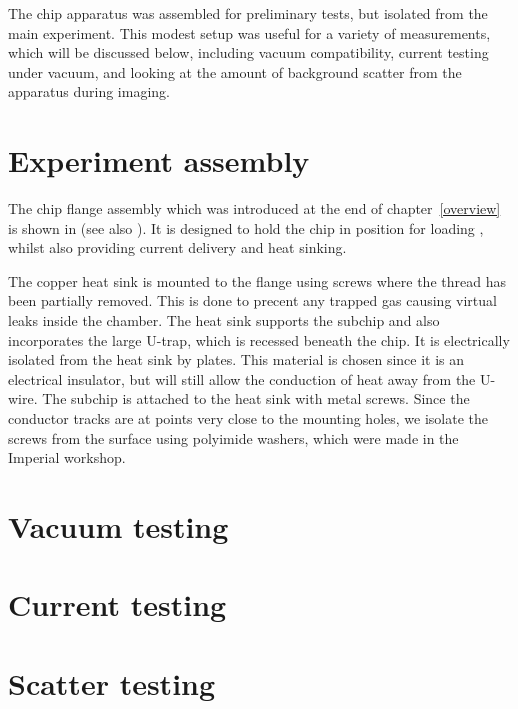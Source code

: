 The chip apparatus was assembled for preliminary tests, but isolated from the 
main \CaF{} experiment. This modest setup was useful for a variety of
measurements, which will be discussed below, including vacuum compatibility,
current testing under vacuum, and looking at the amount of background scatter
from the apparatus during imaging.

\section{Experiment assembly}

The chip flange assembly which was introduced at the end of
chapter~\ref{overview} is shown in  (see also
). It is designed
to hold the chip in position for loading \CaF{}, whilst also providing current
delivery and heat sinking. 

\begin{figure}
  \centering
  \caption{}
  \label{exper:fig:flange}
\end{figure}

The copper heat sink is mounted to the flange using screws where the thread has
been partially removed. This is done to precent any trapped gas causing virtual
leaks inside the chamber. The heat sink supports the subchip and also incorporates the large
U-trap, which is recessed beneath the chip. It is electrically isolated from
the heat sink by \AlN{} plates. This material is chosen since it is an
electrical insulator, but will still allow the conduction of heat away from the
U-wire. The subchip is attached to the heat sink with metal screws. Since the
conductor tracks are at points very close to the mounting holes, we isolate the
screws from the surface using polyimide washers, which were made in the
Imperial workshop.


\section{Vacuum testing}


\section{Current testing}


\section{Scatter testing}


